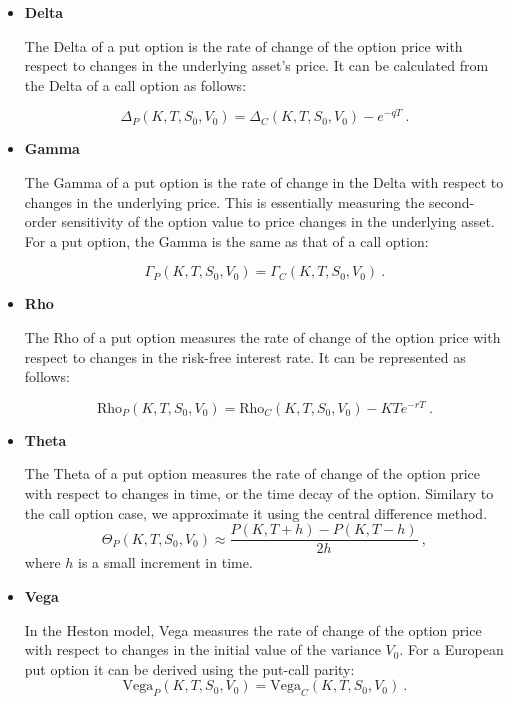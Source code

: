 \begin{itemize}

\item \textbf{Delta} 

The Delta of a put option is the rate of change of the option price with respect to changes in the underlying asset's price. It can be calculated from the Delta of a call option as follows:

$$
\Delta_P(K,T,S_0,V_0) = \Delta_C(K,T, S_0, V_0) - e^{-q T} \ .
$$


\item \textbf{Gamma} 

The Gamma of a put option is the rate of change in the Delta with respect to changes in the underlying price. This is essentially measuring the second-order sensitivity of the option value to price changes in the underlying asset. For a put option, the Gamma is the same as that of a call option:

$$
\Gamma_P(K,T,S_0,V_0) = \Gamma_C(K,T, S_0, V_0) \ .
$$



\item \textbf{Rho} 

The Rho of a put option measures the rate of change of the option price with respect to changes in the risk-free interest rate. It can be represented as follows:

$$
\text{Rho}_P(K,T,S_0,V_0) = \text{Rho}_C(K,T, S_0, V_0) - KTe^{-rT} \ .
$$



\item \textbf{Theta} 

The Theta of a put option measures the rate of change of the option price with respect to changes in time, or the time decay of the option. Similary to the call option case, we approximate it using the central difference method. 
$$
 \Theta_P(K,T,S_0,V_0) \approx \frac{P(K,T+h) - P(K,T-h)}{2h} \ ,
$$
where $h$ is a small increment in time. 


\item \textbf{Vega} 

In the Heston model, Vega measures the rate of change of the option price with respect to changes in the initial value of the variance $V_0$. For a European put option it can be derived using the put-call parity:
$$
\text{Vega}_P(K,T,S_0,V_0) = \text{Vega}_C(K,T, S_0, V_0) \ .
$$

\end{itemize}









